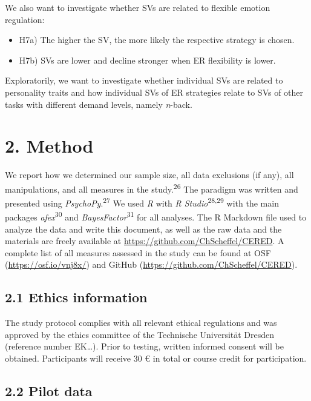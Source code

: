 \documentclass[
  english,
  man,floatsintext]{apa6}
\providecommand{\tightlist}{%
  \setlength{\itemsep}{0pt}\setlength{\parskip}{0pt}}
\begin{document}
We also want to investigate whether SVs are related to flexible emotion regulation:

\begin{itemize}
\tightlist
\item
  H7a) The higher the SV, the more likely the respective strategy is chosen.
\item
  H7b) SVs are lower and decline stronger when ER flexibility is lower.
\end{itemize}

Exploratorily, we want to investigate whether individual SVs are related to personality traits and how individual SVs of ER strategies relate to SVs of other tasks with different demand levels, namely \emph{n}-back.

\hypertarget{method}{%
\section{2. Method}\label{method}}

We report how we determined our sample size, all data exclusions (if any), all manipulations, and all measures in the study.\textsuperscript{26}
The paradigm was written and presented using \emph{PsychoPy}.\textsuperscript{27}
We used \emph{R} with \emph{R Studio}\textsuperscript{28,29} with the main packages \emph{afex}\textsuperscript{30} and \emph{BayesFactor}\textsuperscript{31} for all analyses.
The R Markdown file used to analyze the data and write this document, as well as the raw data and the materials are freely available at \url{https://github.com/ChScheffel/CERED}.
A complete list of all measures assessed in the study can be found at OSF (\url{https://osf.io/vnj8x/}) and GitHub (\url{https://github.com/ChScheffel/CERED}).

\hypertarget{ethics-information}{%
\subsection{2.1 Ethics information}\label{ethics-information}}

The study protocol complies with all relevant ethical regulations and was approved by the ethics committee of the Technische Universität Dresden (reference number EK\ldots).
Prior to testing, written informed consent will be obtained.
Participants will receive 30 € in total or course credit for participation.

\hypertarget{pilot-data}{%
\subsection{2.2 Pilot data}\label{pilot-data}}
\end{document}
